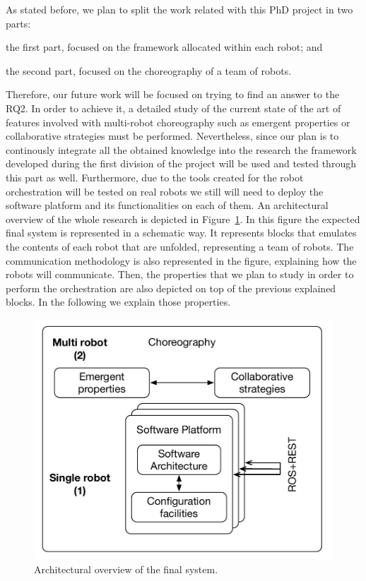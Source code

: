 As stated before, we plan to split the work related with this PhD project in two parts: 
\begin{enumerate*}
\item the first part, focused on the framework allocated within each robot; and
\item the second part, focused on the choreography of a team of robots.
\end{enumerate*}

Therefore, our future work will be focused on trying to find an answer to the RQ2.
In order to achieve it, a detailed study of the current state of the art of features involved with multi-robot choreography such as emergent properties or collaborative strategies must be performed.
Nevertheless, since our plan is to continously integrate all the obtained knowledge into the research the framework developed during the first division of the project will be used and tested through this part as well.
Furthermore, due to the tools created for the robot orchestration will be tested on real robots we still will need to deploy the software platform and its functionalities on each of them.
An architectural overview of the whole research is depicted in Figure~\ref{fig:overview}.
In this figure the expected final system is represented in a schematic way.
It represents blocks that emulates the contents of each robot that are unfolded, representing a team of robots.
The communication methodology is also represented in the figure, explaining how the robots will communicate.
Then, the properties that we plan to study in order to perform the orchestration are also depicted on top of the previous explained blocks. 
In the following we explain those properties.

\begin{figure}[!t]
\begin{center}
\includegraphics[width=1\linewidth]{Figures/researchv2.pdf}
\caption{Architectural overview of the final system.}
\label{fig:overview}
\end{center}
\end{figure}